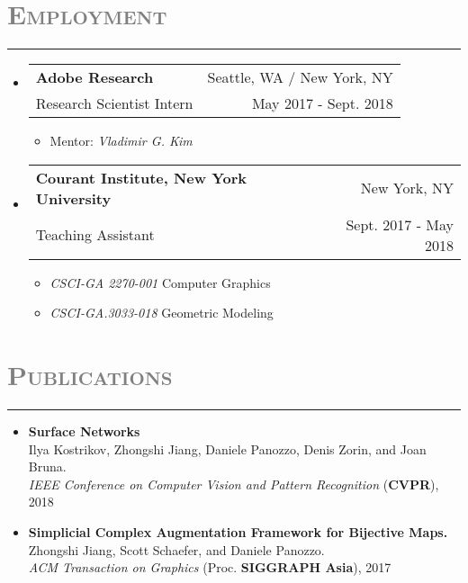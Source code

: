 \documentclass[letterpaper,11pt]{article}
\makeatletter
\newcommand{\resitem}[1]{\item #1 \vspace{-2pt}}
\newcommand{\resheading}[1]{
\vspace{0pt}
\section*{\scshape \textcolor{gray}{#1}}
\rule{\textwidth}{0.5pt}
  \vspace{-15pt}
}
\newcommand{\ressubheading}[4]{\vspace{-2pt}
\begin{tabular*}{6.8in}{l@{\cftdotfill{\cftsecdotsep}\extracolsep{\fill}}r}
		\textbf{#1} & #2 \\
	\parbox[l]{350pt}{#3} & #4 \\
\end{tabular*}\vspace{-6pt}
}
\makeatother
\begin{document}
\resheading{Employment}
\begin{itemize}[label=,leftmargin=*]
		\item 
\ressubheading{Adobe Research}{Seattle, WA / New York, NY}{Research Scientist Intern}{May 2017 - Sept. 2018}
\begin{itemize}[label=,leftmargin=8pt]
	\resitem{Mentor: \textit{Vladimir G. Kim}}
\end{itemize}

\item
\ressubheading{Courant Institute, New York University}{New York, NY}{Teaching Assistant}{Sept. 2017 - May 2018}
\begin{itemize}[label=,leftmargin=8pt]
	\resitem{\textit{CSCI-GA 2270-001} Computer Graphics}
	\resitem{\textit{CSCI-GA.3033-018} Geometric Modeling}
\end{itemize}


\end{itemize}

%

\resheading{Publications}
\vspace{-2pt}
\begin{itemize}[label=,leftmargin=*]

\item \textbf{Surface Networks}\\
Ilya Kostrikov, Zhongshi Jiang, Daniele Panozzo, Denis Zorin, and Joan Bruna.
\\ \textit{IEEE Conference on Computer Vision and Pattern Recognition} (\textbf{CVPR}), 2018

\item \textbf{Simplicial Complex Augmentation Framework for Bijective Maps.}\\
Zhongshi Jiang, Scott Schaefer, and Daniele Panozzo.
\\ \textit{ACM Transaction on Graphics} (Proc. \textbf{SIGGRAPH Asia}), 2017
\end{itemize}
\end{document}

